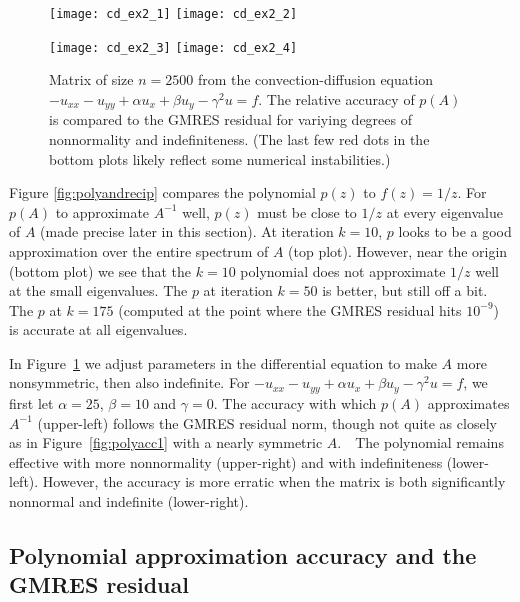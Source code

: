 \documentclass{siamart}
\begin{document}
\begin{figure}[h!]
\begin{center}
\texttt{[image: cd\_ex2\_1]}\quad
\texttt{[image: cd\_ex2\_2]}

\vspace*{8pt}
\texttt{[image: cd\_ex2\_3]}\quad
\texttt{[image: cd\_ex2\_4]}
\end{center}

\vspace*{-5pt}
\caption{Matrix of size $n = 2500$ from the convection-diffusion equation $- u_{xx} - u_{yy} + \alpha u_{x} + \beta u_{y} - \gamma^2 u = f $.  The relative accuracy of $p(A)$ is compared to the GMRES residual for variying degrees of nonnormality and indefiniteness.  (The last few red dots in the bottom plots likely reflect some numerical instabilities.)}
\label{fig:polyacc2}
\end{figure}


Figure \ref{fig:polyandrecip} compares the polynomial $p(z)$  to $f(z) = 1/z$.  For $p(A)$ to approximate $A^{-1}$ well, $p(z)$ must be close to $1/z$ at every eigenvalue of $A$ (made precise later in this section).  At iteration $k=10$, $p$ looks to be a good approximation over the entire spectrum of $A$ (top plot).  However, near the origin (bottom plot) we see that the $k=10$ polynomial does not approximate $1/z$ well at the small eigenvalues.  The $p$ at iteration $k=50$ is better, but still off a bit.  The $p$ at $k=175$ (computed at the point where the GMRES residual hits $10^{-9}$) is accurate at all eigenvalues.

In Figure~\ref{fig:polyacc2} we adjust parameters in the differential equation to make $A$ more nonsymmetric, then also indefinite.  For  $- u_{xx} - u_{yy} + \alpha u_{x} + \beta u_{y} - \gamma^2 u = f $, we first let $\alpha = 25$, $\beta=10$ and $\gamma=0$.  The accuracy with which $p(A)$ approximates $A^{-1}$ (upper-left) follows the GMRES residual norm, though not quite as closely as in Figure~\ref{fig:polyacc1} with a nearly symmetric $A$.\ \ The polynomial remains effective with more nonnormality (upper-right) and with indefiniteness (lower-left).  However, the accuracy is more erratic when the matrix is both significantly nonnormal and indefinite (lower-right).

\subsection{Polynomial approximation accuracy and the GMRES residual}
\end{document}
